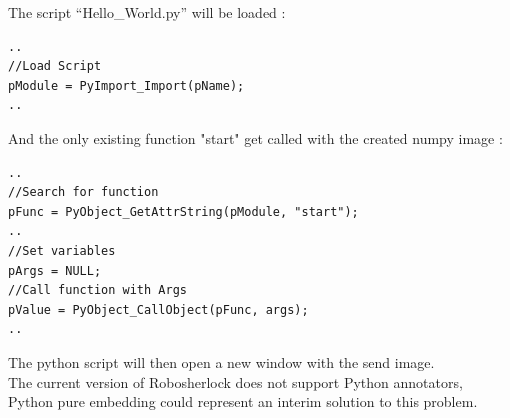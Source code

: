 \documentclass[main.tex]{subfiles}
\begin{document}
The script “Hello\_World.py” will be loaded :  

\begin{lstlisting}
..
//Load Script
pModule = PyImport_Import(pName);
..
\end{lstlisting}
And the only existing function "start" get called with the created numpy image : 
\begin{lstlisting}
..
//Search for function
pFunc = PyObject_GetAttrString(pModule, "start");
..
//Set variables
pArgs = NULL;
//Call function with Args
pValue = PyObject_CallObject(pFunc, args);
..
\end{lstlisting}
The python script will then open a new window with the send image.\\
The current version of Robosherlock does not support Python annotators, Python pure embedding could represent an interim solution to this problem.

\endgroup
\end{document}

